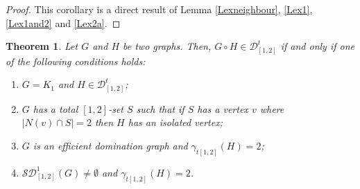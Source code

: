 \documentclass[A4,12pt]{article}
\newtheorem{theorem}{Theorem}[section]
\theoremstyle{definition}
\theoremstyle{remark}
\begin{document}
\begin{proof}
This corollary is a direct result of Lemma \ref{Lexneighbour}, \ref{Lex1}, \ref{Lex1and2} and \ref{Lex2a}.

\end{proof}

\begin{theorem} \label{lexthem}
	Let $G$ and $H$ be two graphs. Then, $G \circ H \in \mathcal{D}^t_{[1,2]}$   if and only if one of the following conditions holds:
\begin{enumerate}
\item
$G=K_1$ and $H \in \mathcal{D}^t_{[1,2]}$;
  \item
  $G$ has a total $[1,2]$-set $S$ such that if $S$ has a vertex $v$ where $\vert N(v) \cap S\vert =2$ then $H$ has an isolated vertex;
  \item
  $G$ is an efficient domination graph and $\gamma_{t[1,2]}(H)=2$;
  \item
  $\mathcal{SD}^1_{[1,2]}(G)\neq \emptyset$ and $\gamma_{t[1,2]}(H)=2$.
\end{enumerate}

\end{theorem}
\end{document}
